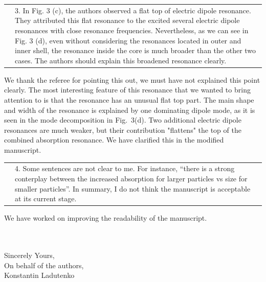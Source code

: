 \documentclass[a4paper]{article}
\begin{document}
\begin{tabular}[!H]{l|p{}}
\quad & 3.  In Fig. 3 (c), the authors observed a flat top of electric
dipole resonance. They attributed this flat resonance to the excited
several electric dipole resonances with close resonance
frequencies. Nevertheless, as we can see in Fig. 3 (d), even without
considering the resonances located in outer and inner shell, the
resonance inside the core is much broader than the other two
cases. The authors should explain this broadened resonance clearly.
\end{tabular}

We thank the referee for pointing this out, we must have not explained
this point clearly. The most interesting feature of this resonance
that we wanted to bring attention to is that the resonance has an
unusual flat top part. The main shape and width of the resonance is
explained by one dominating dipole mode, as it is seen in the mode
decomposition in Fig.~3(d). Two additional electric dipole resonances
are much weaker, but their contribution "flattens" the top of the
combined absorption resonance. We have clarified this in the modified
manuscript.


\begin{tabular}[!H]{l|p{}}
\quad & 4.  Some sentences are not clear to me. For instance, “there
is a strong conterplay between the increased absorption for larger
particles vs size for smaller particles”.  In summary, I do not think
the manuscript is acceptable at its current stage.
\end{tabular}%

We have worked on improving the readability of the manuscript.

\\
\vspace{10pt}
\\
Sincerely Yours,\\
On behalf of the authors,\\
Konstantin Ladutenko
\end{document}
